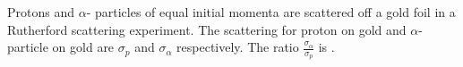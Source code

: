 \iffalse
\title{Assignment7}
\author{ee24btech11064}
\chapter{2016}
\section{ph}
\fi

\item Protons and $\alpha$- particles of equal initial momenta are scattered off a gold foil in a Rutherford scattering experiment. The scattering for proton on gold and $\alpha$-particle on gold are $\sigma_p$ and $\sigma_{\alpha}$ respectively. The ratio $\frac{\sigma_\alpha}{\sigma_p}$ is \underline{\hspace{2cm}}. 

